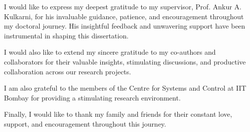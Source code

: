 I would like to express my deepest gratitude to my supervisor, Prof. Ankur A. Kulkarni, for his invaluable guidance, patience, and encouragement throughout my doctoral journey. His insightful feedback and unwavering support have been instrumental in shaping this dissertation.

I would also like to extend my sincere gratitude to my co-authors and collaborators for their valuable insights, stimulating discussions, and productive collaboration across our research projects.

I am also grateful to the members of the Centre for Systems and Control at IIT Bombay for providing a stimulating research environment.

Finally, I would like to thank my family and friends for their constant love, support, and encouragement throughout this journey.